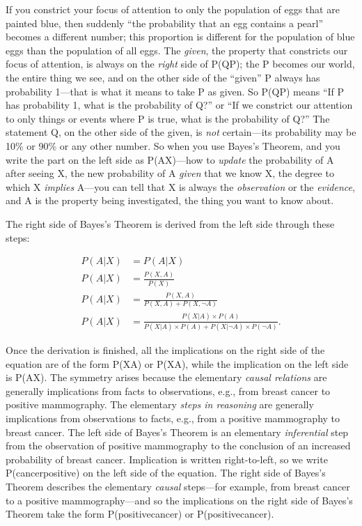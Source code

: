 {
 If you constrict your focus of attention to only the population of
eggs that are painted blue, then suddenly ``the
probability that an egg contains a pearl'' becomes a
different number; this proportion is different for the population of
blue eggs than the population of all eggs. The \textit{given}, the
property that constricts our focus of attention, is always on the
\textit{right} side of P(Q{\textbar}P); the P becomes our world, the
entire thing we see, and on the other side of the
``given'' P always has probability
1---that is what it means to take P as given. So P(Q{\textbar}P) means
``If P has probability 1, what is the probability of
Q?'' or ``If we constrict our
attention to only things or events where P is true, what is the
probability of Q?'' The statement Q, on the other
side of the given, is \textit{not} certain---its probability may be
10\% or 90\% or any other number. So when you use
Bayes's Theorem, and you write the part on the left
side as P(A{\textbar}X)---how to \textit{update} the probability of A
after seeing X, the new probability of A \textit{given} that we know X,
the degree to which X \textit{implies} A---you can tell that X is
always the \textit{observation} or the \textit{evidence}, and A is the
property being investigated, the thing you want to know about.}

{
 The right side of Bayes's Theorem is derived from
the left side through these steps:}

\begin{align*}
  P(A|X) &= P(A|X) \\
  P(A|X) &= \frac{P(X,A)}{P(X)} \\
  P(A|X) &= \frac{P(X,A)}{P(X,A)+P(X,\lnot A)} \\
  P(A|X) &= \frac{P(X|A) \times P(A)}
  {P(X|A) \times P(A) + P(X|\lnot A) \times P(\lnot A)}.
\end{align*}



\bigskip

{
 Once the derivation is finished, all the implications on the right
side of the equation are of the form P(X{\textbar}A) or
P(X{\textbar}{\textlnot}A), while the implication on the left side is
P(A{\textbar}X). The symmetry arises because the elementary
\textit{causal relations} are generally implications from facts to
observations, e.g., from breast cancer to positive mammography. The
elementary \textit{steps in reasoning} are generally implications from
observations to facts, e.g., from a positive mammography to breast
cancer. The left side of Bayes's Theorem is an
elementary \textit{inferential} step from the observation of positive
mammography to the conclusion of an increased probability of breast
cancer. Implication is written right-to-left, so we write
P(cancer{\textbar}positive) on the left side of the equation. The right
side of Bayes's Theorem describes the elementary
\textit{causal} steps---for example, from breast cancer to a positive
mammography---and so the implications on the right side of
Bayes's Theorem take the form
P(positive{\textbar}cancer) or P(positive{\textbar}{\textlnot}cancer).}

